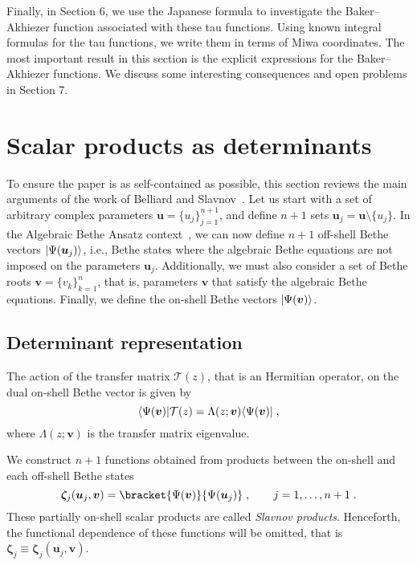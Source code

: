 \documentclass[a4paper,12pt]{amsart}
\begin{document}
Finally, in Section 6, we use the Japanese formula to investigate the
Baker–Akhiezer function associated with these tau functions. Using
known integral formulas for the tau functions, we write them in terms
of Miwa coordinates. The most important result in this section is the
explicit expressions for the Baker–Akhiezer functions. We discuss some
interesting consequences and open problems in Section 7.





\section{Scalar products as determinants}

To ensure the paper is as self-contained as possible, this section
reviews the main arguments of the work of Belliard and
Slavnov~\cite{Belliard:2019bfz}. Let us start with a set of arbitrary
complex parameters \(\bm{u} = \{u_j\}_{j=1}^{n+1}\), and define
\(n+1\) sets \(\bm{u}_j=\bm{u}\setminus \{u_j\}\). In the Algebraic
Bethe Ansatz context~\cite{Korepin:1993kvr, Slavnov:2019aba}, we can
now define \(n+1\) off-shell Bethe vectors \(\lvert\Psi(\bm{u}_j)\rangle\),
i.e., Bethe states where the algebraic Bethe equations are not imposed
on the parameters \(\bm{u}_j\). Additionally, we must also consider a
set of Bethe roots \(\bm{v} = \{ v_k \}_{k=1}^n\), that is, parameters
\(\bm{v}\) that satisfy the algebraic Bethe equations. Finally, we
define the on-shell Bethe vectors \(\lvert\Psi(\bm{v})\rangle\).


\subsection{Determinant representation}
The action of the transfer matrix \(\mathcal{T}(z)\), that is an
Hermitian operator, on the dual on-shell Bethe vector is given by
\begin{equation}
\label{eq:eigenvalue-bethe}
\langle\Psi(\bm{v})\rvert\mathcal{T}(z) = \Lambda(z; \bm{v}) \langle\Psi(\bm{v})\rvert \; , 
\end{equation}
where \(\Lambda(z; \bm{v}) \) is the transfer matrix eigenvalue.

We construct \(n+1\) functions obtained from products between the
on-shell and each off-shell Bethe states
\begin{equation}
  \bm{\zeta}_j(\bm{u}_j, \bm{v}) 
  = \bracket{\Psi(\bm{v})}{\Psi(\bm{u}_j)}\; ,\qquad j =1, \dots, n+1\; .
\end{equation}
These partially on-shell scalar products are called \emph{Slavnov
products}.  Henceforth, the functional dependence of these functions
will be omitted, that is \(\bm{\zeta}_j\equiv \bm{\zeta}_j(\bm{u}_j,
\bm{v})\).
\end{document}
